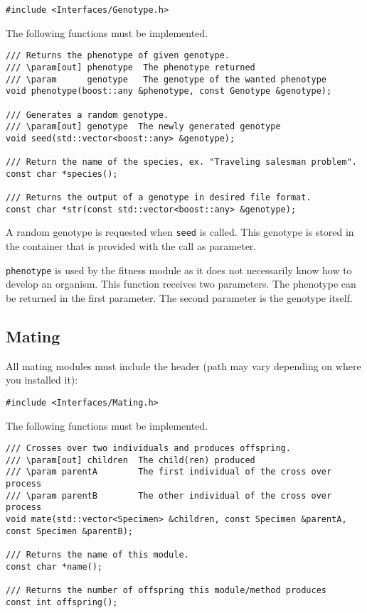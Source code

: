 \begin{verbatim}
#include <Interfaces/Genotype.h>
\end{verbatim}

\noindent The following functions must be implemented.

\begin{verbatim}
/// Returns the phenotype of given genotype.
/// \param[out]	phenotype  The phenotype returned
/// \param		genotype   The genotype of the wanted phenotype
void phenotype(boost::any &phenotype, const Genotype &genotype);

/// Generates a random genotype.
/// \param[out] genotype  The newly generated genotype
void seed(std::vector<boost::any> &genotype);

/// Return the name of the species, ex. "Traveling salesman problem".
const char *species();

/// Returns the output of a genotype in desired file format.
const char *str(const std::vector<boost::any> &genotype);
\end{verbatim}

\noindent A random genotype is requested when \texttt{seed} is called. This genotype is stored in the container that is provided with the call as parameter.

\texttt{phenotype} is used by the fitness module as it does not necessarily know how to develop an organism. This function receives two parameters. The phenotype can be returned in the first parameter. The second parameter is the genotype itself.


\subsection{Mating}

All mating modules must include the header (path may vary depending on where you installed it):

\begin{verbatim}
#include <Interfaces/Mating.h>
\end{verbatim}

\noindent The following functions must be implemented.

\begin{verbatim}
/// Crosses over two individuals and produces offspring.
/// \param[out] children  The child(ren) produced
/// \param parentA        The first individual of the cross over process
/// \param parentB        The other individual of the cross over process
void mate(std::vector<Specimen> &children, const Specimen &parentA, const Specimen &parentB);

/// Returns the name of this module.
const char *name();

/// Returns the number of offspring this module/method produces
const int offspring();
\end{verbatim}

